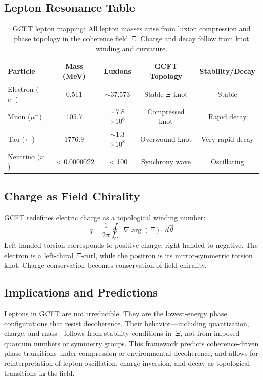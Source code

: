 \subsection{Lepton Resonance Table}

\begin{table}[H]
\centering
\begin{tabular}{lcccc}
\hline
\textbf{Particle} & \textbf{Mass (MeV)} & \textbf{Luxions} & \textbf{GCFT Topology} & \textbf{Stability/Decay} \\
\hline
Electron ($e^-$) & 0.511   & $\sim$37,573     & Stable $\Xi$-knot      & Stable \\
Muon ($\mu^-$)   & 105.7   & $\sim$7.8$\times 10^6$ & Compressed knot     & Rapid decay \\
Tau ($\tau^-$)   & 1776.9  & $\sim$1.3$\times 10^8$  & Overwound knot      & Very rapid decay \\
Neutrino ($\nu$) & $<0.0000022$ & $<$100    & Synchrony wave         & Oscillating \\
\hline
\end{tabular}
\caption{GCFT lepton mapping: All lepton masses arise from luxion compression and phase topology in the coherence field $\Xi$. Charge and decay follow from knot winding and curvature.}
\label{tab:lepton_gcft}
\end{table}

\subsection{Charge as Field Chirality}

GCFT redefines electric charge as a topological winding number:
\[
q = \frac{1}{2\pi} \oint_C \nabla \arg(\Xi) \cdot d\vec{\theta}
\]
Left-handed torsion corresponds to positive charge, right-handed to negative. The electron is a left-chiral $\Xi$-curl, while the positron is its mirror-symmetric torsion knot. Charge conservation becomes conservation of field chirality.

\subsection{Implications and Predictions}

Leptons in GCFT are not irreducible. They are the lowest-energy phase configurations that resist decoherence. Their behavior---including quantization, charge, and mass---follows from stability conditions in~$\Xi$, not from imposed quantum numbers or symmetry groups. This framework predicts coherence-driven phase transitions under compression or environmental decoherence, and allows for reinterpretation of lepton oscillation, charge inversion, and decay as topological transitions in the field.

